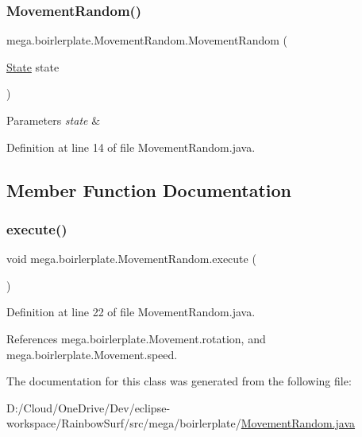 \subsubsection{\texorpdfstring{Movement\+Random()}{MovementRandom()}}
{\footnotesize\ttfamily mega.\+boirlerplate.\+Movement\+Random.\+Movement\+Random (\begin{DoxyParamCaption}\item[{\hyperlink{classmega_1_1boirlerplate_1_1_state}{State}}]{state }\end{DoxyParamCaption})}


\begin{DoxyParams}{Parameters}
{\em state} & \\
\hline
\end{DoxyParams}


Definition at line 14 of file Movement\+Random.\+java.



\subsection{Member Function Documentation}
\mbox{\label{classmega_1_1boirlerplate_1_1_movement_random_a4a31d26a518a73f33211d0da4a384b12}} 
\subsubsection{\texorpdfstring{execute()}{execute()}}
{\footnotesize\ttfamily void mega.\+boirlerplate.\+Movement\+Random.\+execute (\begin{DoxyParamCaption}{ }\end{DoxyParamCaption})}



Definition at line 22 of file Movement\+Random.\+java.



References mega.\+boirlerplate.\+Movement.\+rotation, and mega.\+boirlerplate.\+Movement.\+speed.



The documentation for this class was generated from the following file\+:\begin{DoxyCompactItemize}
\item 
D\+:/\+Cloud/\+One\+Drive/\+Dev/eclipse-\/workspace/\+Rainbow\+Surf/src/mega/boirlerplate/\hyperlink{_movement_random_8java}{Movement\+Random.\+java}\end{DoxyCompactItemize}
